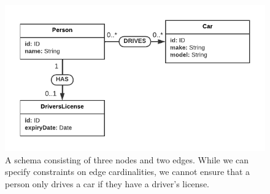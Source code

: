 \documentclass{report}
\theoremstyle{definition}
\newcommand{\otype}{\tau^\mathsf{o}}
\begin{document}
\begin{figure}[t]
  \centering
  \includegraphics{figures/drivers-license.pdf}
  \caption{A schema consisting of three nodes and two edges. While we can specify constraints on edge cardinalities, we cannot ensure that a person only drives a car if they have a driver's license.}
  \label{fig:drivers-license}
\end{figure}




\end{document}
